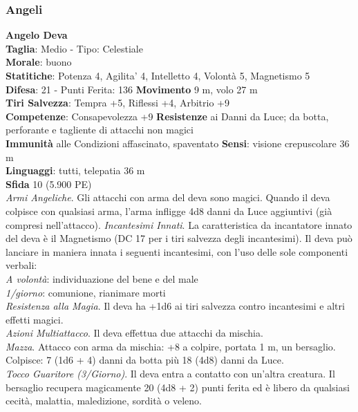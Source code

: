 \begin{multicols}{2}
\subsubsection{Angeli}
\medskip\textbf{Angelo Deva}\\
\textbf{Taglia}: Medio  - Tipo: Celestiale\\
\textbf{Morale}: buono\\
\textbf{Statitiche}: Potenza 4, Agilita' 4, Intelletto 4, Volontà 5, Magnetismo 5\\
\textbf{Difesa}: 21 - Punti Ferita: 136
\textbf{Movimento} 9 m, volo 27 m\\
\textbf{Tiri Salvezza}: Tempra +5, Riflessi +4, Arbitrio +9\\
\textbf{Competenze}: Consapevolezza +9
\textbf{Resistenze} ai Danni da Luce; da botta, perforante e tagliente di attacchi non magici\\
\textbf{Immunità} alle Condizioni affascinato, spaventato
\textbf{Sensi}: visione crepuscolare 36 m\\
\textbf{Linguaggi}: tutti, telepatia 36 m\\
\textbf{Sfida} 10 (5.900 PE)\\
\textit{Armi Angeliche}. Gli attacchi con arma del deva sono magici. Quando il deva colpisce con qualsiasi arma, l’arma infligge 4d8 danni da Luce aggiuntivi (già compresi nell’attacco).
\textit{Incantesimi Innati}. La caratteristica da incantatore innato del deva è il Magnetismo (DC 17 per i tiri salvezza degli incantesimi). Il deva può lanciare in maniera innata i seguenti incantesimi, con l’uso delle sole componenti verbali:\\
\textit{A volontà}: individuazione del bene e del male\\
\textit{1/giorno}: comunione, rianimare morti\\
\textit{Resistenza alla Magia}. Il deva ha +1d6 ai tiri salvezza contro incantesimi e altri effetti magici.\\
\textit{Azioni Multiattacco}. Il deva effettua due attacchi da mischia.\\
\textit{Mazza}. Attacco con arma da mischia: +8 a colpire, portata 1 m, un bersaglio.
Colpisce: 7 (1d6 + 4) danni da botta più 18 (4d8) danni da Luce. \\
\textit{Tocco Guaritore (3/Giorno)}. Il deva entra a contatto con un’altra creatura. Il bersaglio recupera magicamente 20 (4d8 + 2) punti ferita ed è libero da qualsiasi cecità, malattia, maledizione, sordità o veleno.\\

\end{multicols}
